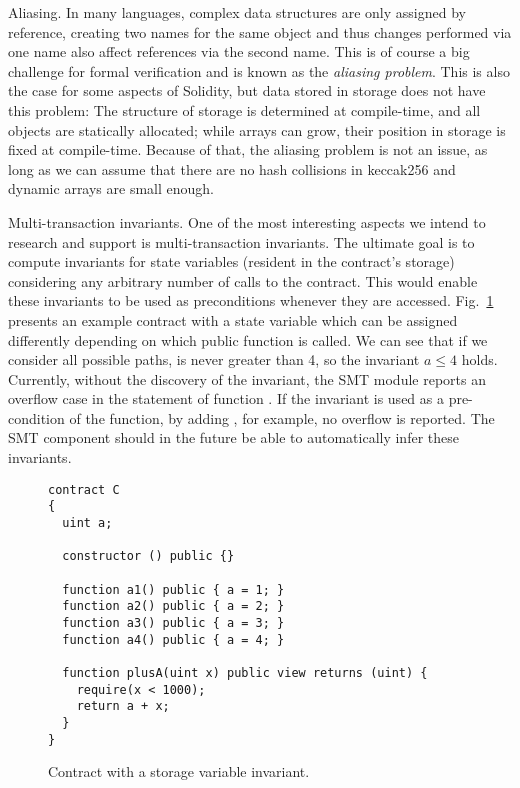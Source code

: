 \begin{paragraph}{Aliasing.}
In many languages, complex data structures are only assigned by
reference, creating two names for the same object and thus changes
performed via one name also affect references via the second name.
This is of course a big challenge for formal verification and
is known as the \emph{aliasing problem}.
This is also the case for some aspects of Solidity, but data stored
in storage does not have this problem: The structure of
storage is determined at compile-time, and all objects are
statically allocated; while arrays can grow, their position in
storage is fixed at compile-time. Because of that, the aliasing problem
is not an issue, as long as we can assume that there are no hash
collisions in keccak256 and dynamic arrays are small enough.
\end{paragraph}

\begin{paragraph}{Multi-transaction invariants.}
One of the most interesting aspects we intend to research and support is
multi-transaction invariants.
%
The ultimate goal is to compute invariants for state variables (resident in the
contract's storage) considering any arbitrary number of calls to the contract.
%
This would enable these invariants to be used as preconditions whenever they
are accessed.
%
Fig.~\ref{fig:invariant_a} presents an example contract with a state variable
 which can be assigned differently depending on which public function
is called.
%
We can see that if we consider all possible paths,  is never greater
than 4, so the invariant $a \le 4$ holds.
%
Currently, without the discovery of the invariant, the SMT module reports an
overflow case in the  statement of function .
%
If the invariant is used as a pre-condition of the function, by adding
, for example, no overflow is reported.
%
The SMT component should in the future be able to automatically infer these
invariants.

\begin{figure}
\begin{verbatim}
contract C
{
  uint a;

  constructor () public {}

  function a1() public { a = 1; }
  function a2() public { a = 2; }
  function a3() public { a = 3; }
  function a4() public { a = 4; }

  function plusA(uint x) public view returns (uint) {
    require(x < 1000);
    return a + x;
  }
}
\end{verbatim}
\caption{Contract with a storage variable invariant.}
\label{fig:invariant_a}
\end{figure}

\end{paragraph}

